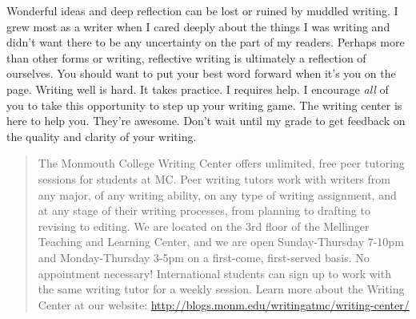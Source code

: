 \documentclass[]{tufte-handout}
\begin{document}
Wonderful ideas and deep reflection can be lost or ruined by muddled writing.  I grew most as a writer when I cared deeply about the things I was writing and didn't want there to be any uncertainty on the part of my readers. Perhaps more than other forms or writing, reflective writing is ultimately a reflection of ourselves. You should want to put your best word forward when it's you on the page. Writing well is hard. It takes practice. I requires help. I encourage \textit{all} of you to take this opportunity to step up your writing game. The writing center is here to help you. They're awesome. Don't wait until my grade to get feedback on the quality and clarity of your writing.  
\begin{quote}
The Monmouth College Writing Center offers unlimited, free peer tutoring sessions for students at MC.  Peer writing tutors work with writers from any major, of any writing ability, on any type of writing assignment, and at any stage of their writing processes, from planning to drafting to revising to editing.  We are located on the 3rd floor of the Mellinger Teaching and Learning Center, and we are open Sunday-Thursday 7-10pm and Monday-Thursday 3-5pm on a first-come, first-served basis.  No appointment necessary!  International students can sign up to work with the same writing tutor for a weekly session. Learn more about the Writing Center at our website: \url{http://blogs.monm.edu/writingatmc/writing-center/}
\end{quote}




\end{document}
